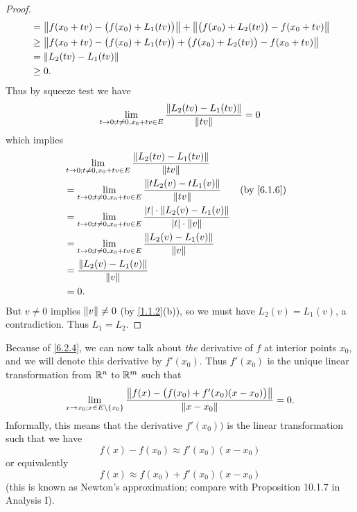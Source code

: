 \begin{proof}
\begin{align*}
     & = \norm*{f(x_0 + tv) - \big(f(x_0) + L_1(tv)\big)} + \norm*{\big(f(x_0) + L_2(tv)\big) - f(x_0 + tv)} \\
     & \geq \norm*{f(x_0 + tv) - \big(f(x_0) + L_1(tv)\big) + \big(f(x_0) + L_2(tv)\big) - f(x_0 + tv)}      \\
     & = \norm*{L_2(tv) - L_1(tv)}                                                                           \\
     & \geq 0.
  \end{align*}
  Thus by squeeze test we have
  \[
    \lim_{t \to 0 ; t \neq 0, x_0 + tv \in E} \dfrac{\norm*{L_2(tv) - L_1(tv)}}{\norm*{tv}} = 0
  \]
  which implies
  \begin{align*}
     & \lim_{t \to 0 ; t \neq 0, x_0 + tv \in E} \dfrac{\norm*{L_2(tv) - L_1(tv)}}{\norm*{tv}}                                            \\
     & = \lim_{t \to 0 ; t \neq 0, x_0 + tv \in E} \dfrac{\norm*{t L_2(v) - t L_1(v)}}{\norm*{tv}}                        &  & \by{6.1.6} \\
     & = \lim_{t \to 0 ; t \neq 0, x_0 + tv \in E} \dfrac{\abs{t} \cdot \norm*{L_2(v) - L_1(v)}}{\abs{t} \cdot \norm*{v}}                 \\
     & = \lim_{t \to 0 ; t \neq 0, x_0 + tv \in E} \dfrac{\norm*{L_2(v) - L_1(v)}}{\norm*{v}}                                             \\
     & = \dfrac{\norm*{L_2(v) - L_1(v)}}{\norm*{v}}                                                                                       \\
     & = 0.
  \end{align*}
  But \(v \neq 0\) implies \(\norm*{v} \neq 0\) (by \cref{1.1.2}(b)), so we must have \(L_2(v) = L_1(v)\), a contradiction.
  Thus \(L_1 = L_2\).
\end{proof}

\begin{note}
  Because of \cref{6.2.4}, we can now talk about \emph{the} derivative of \(f\) at interior points \(x_0\), and we will denote this derivative by \(f'(x_0)\).
  Thus \(f'(x_0)\) is the unique linear transformation from \(\R^n\) to \(\R^m\) such that
  \[
    \lim_{x \to x_0 ; x \in E \setminus \{x_0\}} \dfrac{\norm*{f(x) - \big(f(x_0) + f'(x_0)(x - x_0)\big)}}{\norm*{x - x_0}} = 0.
  \]
  Informally, this means that the derivative \(f'(x_0))\) is the linear transformation such that we have
  \[
    f(x) - f(x_0) \approx f'(x_0)(x - x_0)
  \]
  or equivalently
  \[
    f(x) \approx f(x_0) + f'(x_0)(x - x_0)
  \]
  (this is known as Newton's approximation;
  compare with Proposition 10.1.7 in Analysis I).
\end{note}

